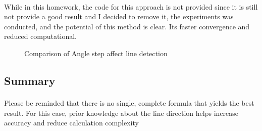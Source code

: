 \documentclass[12pt,a4paper]{report}
\begin{document}
\paragraph*{}
While in this homework, the code for this approach is not provided since it is still not provide a good result and I decided to remove it, the experiments was conducted, and the potential of this method is clear. Its faster convergence and reduced computational.

\begin{figure}[!htb]
    \begin{minipage}{\linewidth}
        \centering
        \begin{subfigure}{0.49\textwidth}
        \end{subfigure}
        \begin{subfigure}{0.49\textwidth}
        \end{subfigure}

        \begin{subfigure}{0.49\textwidth}
        \end{subfigure}
        \begin{subfigure}{0.49\textwidth}
        \end{subfigure}

        \caption{Comparison of Angle step affect line detection}
    \end{minipage}

\end{figure}

\clearpage

\subsection{Summary}
\paragraph*{}Please be reminded that there is no single, complete formula that yields the best
result. For this case, prior knowledge about the line direction helps increase accuracy and reduce calculation complexity
\end{document}

